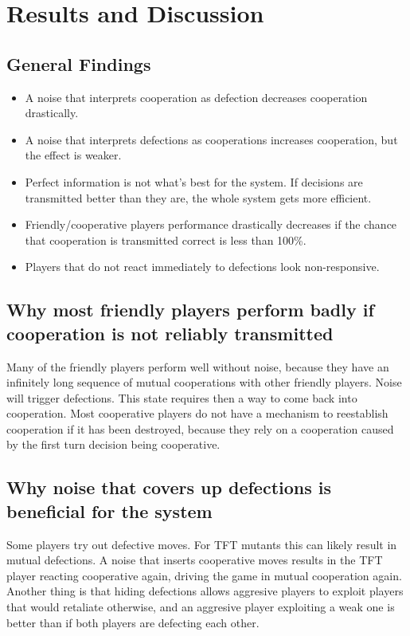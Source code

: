 \documentclass[11pt,twoside]{article}
\begin{document}
\section{Results and Discussion}

\subsection{General Findings}

\begin{itemize}
	\item A noise that interprets cooperation as defection decreases cooperation drastically.
	\item A noise that interprets defections as cooperations increases cooperation, but the effect is weaker.
	\item Perfect information is not what’s best for the system. If decisions are transmitted better than they are, the whole system gets more efficient.
	\item Friendly/cooperative players performance drastically decreases if the chance that cooperation is transmitted correct is less than 100\%.
	\item Players that do not react immediately to defections look non-responsive.
\end{itemize}

\subsection{Why most friendly players perform badly if cooperation is not reliably transmitted}
Many of the friendly players perform well without noise, because they have an infinitely long sequence of mutual cooperations with other friendly players. Noise will trigger defections. This state requires then a way to come back into cooperation. Most cooperative players do not have a mechanism to reestablish cooperation if it has been destroyed, because they rely on a cooperation caused by the first turn decision being cooperative. 

\subsection{Why noise that covers up defections is beneficial for the system}
Some players try out defective moves. For TFT mutants this can likely result in mutual defections. A noise that inserts cooperative moves results in the TFT player reacting cooperative again, driving the game in mutual cooperation again. Another thing is that hiding defections allows aggresive players to exploit players that would retaliate otherwise, and an aggresive player exploiting a weak one is better than if both players are defecting each other.
\end{document}
